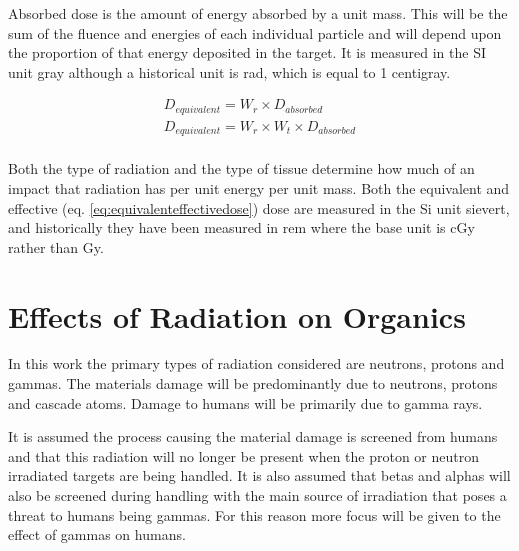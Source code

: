 Absorbed dose is the amount of energy absorbed by a unit mass.  This will be the sum of the fluence and energies of each individual particle and will depend upon the proportion of that energy deposited in the target.  It is measured in the SI unit \gls{gray} although a historical unit is \gls{rad}, which is equal to 1 centigray.

\begin{equation}
\begin{split}
D_{equivalent} = W_{r} \times D_{absorbed} \\
D_{equivalent} = W_{r} \times W_{t} \times D_{absorbed} \\
\label{eq:equivalenteffectivedose}
\end{split}
\end{equation}

Both the type of radiation and the type of tissue determine how much of an impact that radiation has per unit energy per unit mass.  Both the equivalent and effective (eq. \ref{eq:equivalenteffectivedose}) dose are measured in the Si unit \gls{sievert}, and historically they have been measured in \gls{rem} where the base unit is cGy rather than Gy.






\FloatBarrier




\section{Effects of Radiation on Organics}
\label{section:effectsofradiationorg}

In this work the primary types of radiation considered are neutrons, protons and gammas.  The materials damage will be predominantly due to neutrons, protons and cascade atoms.  Damage to humans will be primarily due to gamma rays. 

It is assumed the process causing the material damage is screened from humans and that this radiation will no longer be present when the proton or neutron irradiated targets are being handled.  It is also assumed that betas and alphas will also be screened during handling with the main source of irradiation that poses a threat to humans being gammas.  For this reason more focus will be given to the effect of gammas on humans.



